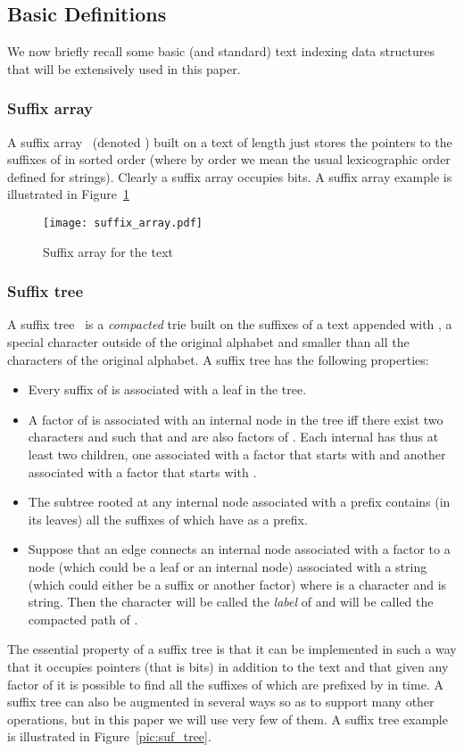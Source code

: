\documentclass{article}
\newcommand{\?}{\mskip1.5mu}
\begin{document}
\subsection{Basic Definitions}
We now briefly recall some basic (and standard) text indexing data structures that will be extensively used in this paper. 
\subsubsection{Suffix array}
A suffix array~\cite{MM93} (denoted ) built on a text  of length  just stores the pointers to the suffixes of  in sorted order (where by order we mean the usual lexicographic order defined for strings). Clearly a suffix array occupies  bits. A suffix array example is illustrated in Figure~\ref{pic:suffix_array}
\begin{figure}[htb] 
\centering\texttt{[image: suffix\_array.pdf]} 
\caption{Suffix array for the text } \label{pic:suffix_array} \end{figure}
\subsubsection{Suffix tree}
A suffix tree~\cite{Wr73,Mc76} is a \emph{compacted} trie built on the suffixes of a text  appended with , a special character outside of the original alphabet and smaller than all the characters of the original alphabet. 
A suffix tree has the following properties:
\begin{itemize}
\item Every suffix of  is associated with a leaf in the tree.
\item A factor  of  is associated with an internal node in the tree iff there exist two characters  and  such that  and  are also factors of . Each internal has thus at least two children, one associated with a factor that starts with  and another associated with a factor that starts with . 
\item The subtree rooted at any internal node associated with a prefix  contains (in its leaves) all the suffixes of  which have  as a prefix. 
\item Suppose that an edge connects an internal node  associated with a factor  to a node  (which could be a leaf or an internal node) associated with a string  (which could either be a suffix or another factor) where  is a character and  is string. Then the character  will be called the \emph{label} of  and  will be called the compacted path of . 
\end{itemize}
 The essential property of a suffix tree is that it can be implemented in such a way
that it occupies  pointers (that is  bits) in addition to the text and that given any factor  of  it is possible to find all the suffixes of  which are prefixed by  in  time. A suffix tree can also be augmented in several ways so as to support many other operations, but in this paper we will use very few of them. A suffix tree example is illustrated in Figure~\ref{pic:suf_tree}.
\end{document}
